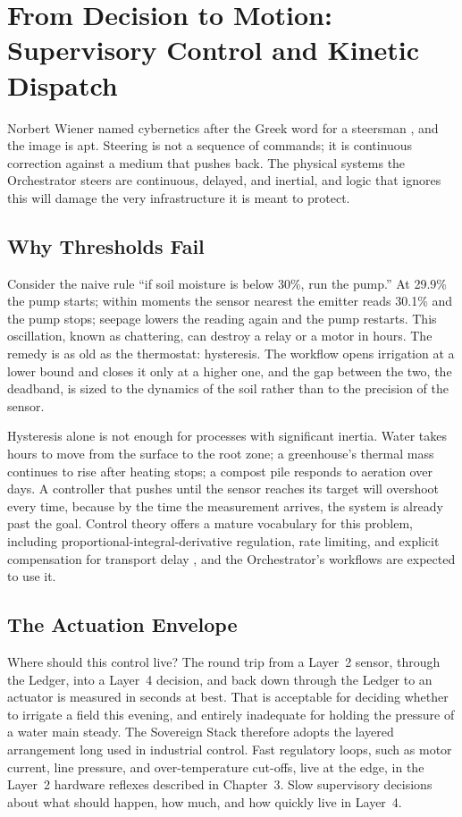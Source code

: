 \section{From Decision to Motion: Supervisory Control and Kinetic Dispatch}

Norbert Wiener named cybernetics after the Greek word for a steersman \parencite{wiener1948}, and the image is apt. Steering is not a sequence of commands; it is continuous correction against a medium that pushes back. The physical systems the Orchestrator steers are continuous, delayed, and inertial, and logic that ignores this will damage the very infrastructure it is meant to protect.

\subsection{Why Thresholds Fail}

Consider the naive rule ``if soil moisture is below 30\%, run the pump.'' At 29.9\% the pump starts; within moments the sensor nearest the emitter reads 30.1\% and the pump stops; seepage lowers the reading again and the pump restarts. This oscillation, known as chattering, can destroy a relay or a motor in hours. The remedy is as old as the thermostat: hysteresis. The workflow opens irrigation at a lower bound and closes it only at a higher one, and the gap between the two, the deadband, is sized to the dynamics of the soil rather than to the precision of the sensor.

Hysteresis alone is not enough for processes with significant inertia. Water takes hours to move from the surface to the root zone; a greenhouse's thermal mass continues to rise after heating stops; a compost pile responds to aeration over days. A controller that pushes until the sensor reaches its target will overshoot every time, because by the time the measurement arrives, the system is already past the goal. Control theory offers a mature vocabulary for this problem, including proportional-integral-derivative regulation, rate limiting, and explicit compensation for transport delay \parencite{astrom2008feedback}, and the Orchestrator's workflows are expected to use it.

\subsection{The Actuation Envelope}

Where should this control live? The round trip from a Layer~2 sensor, through the Ledger, into a Layer~4 decision, and back down through the Ledger to an actuator is measured in seconds at best. That is acceptable for deciding whether to irrigate a field this evening, and entirely inadequate for holding the pressure of a water main steady. The Sovereign Stack therefore adopts the layered arrangement long used in industrial control. Fast regulatory loops, such as motor current, line pressure, and over-temperature cut-offs, live at the edge, in the Layer~2 hardware reflexes described in Chapter~3. Slow supervisory decisions about what should happen, how much, and how quickly live in Layer~4.

